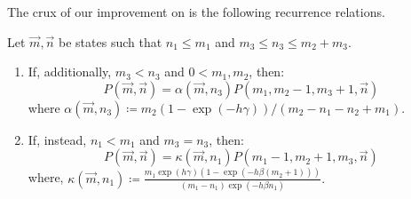The crux of our improvement on  is the following recurrence
relations.
\begin{lemma}\label{lem:recrel}
  Let $\vec{m},\vec{n}$ be states such that $n_1 \leq m_1$ and $m_3 \leq n_3 \leq m_2 + m_3$.
  \begin{enumerate}[label=(\roman*)]
      \item If, additionally,
        $m_3 < n_3$ and
        $0 < m_1,m_2$, then:
      \[ P(\vec{m},\vec{n}) = \alpha(\vec{m},n_3) P(m_1,m_2-1,m_3+1,\vec{n}) \]
      where
      \(
        \alpha(\vec{m},n_3) \coloneqq m_2
        (1-\exp(-h\gamma)) / (m_2-n_1-n_2+m_1).
      \) \label{itm:alpha}
      \item If, instead, $n_1 < m_1$ and $m_3 = n_3$, then:
      \[ P(\vec{m},\vec{n}) = \kappa(\vec{m},n_1) P(m_1-1,m_2+1,m_3,\vec{n}) \]
      where,
      \(
        \kappa(\vec{m},n_1) \coloneqq \frac{m_1\exp(h\gamma) (1-\exp(-h\beta (m_2+1)))}{(m_1-n_1)\exp(-h\beta n_1)}.
      \) \label{itm:kappa}
  \end{enumerate}
\end{lemma}
